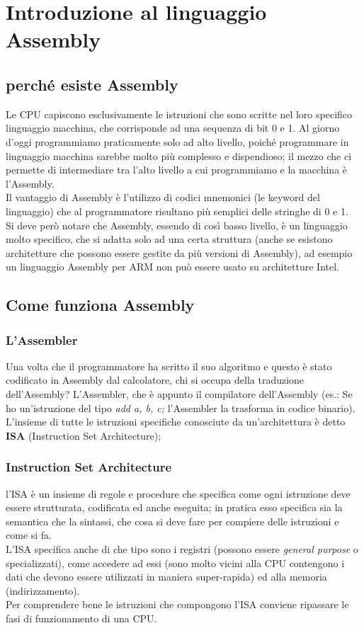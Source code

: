\documentclass[class=book, crop=false]{standalone}
\begin{document}
\chapter{Introduzione al linguaggio Assembly}

\section{perché esiste Assembly}

Le CPU capiscono esclusivamente le istruzioni che sono scritte nel loro specifico linguaggio macchina, che corrisponde ad una sequenza di bit 0 e 1.
Al giorno d’oggi programmiamo praticamente solo ad alto livello,  poiché programmare in linguaggio macchina sarebbe molto più complesso e dispendioso; il mezzo che ci permette di intermediare  tra l'alto livello a cui programmiamo e la macchina è l’Assembly.\\
Il vantaggio di Assembly è l’utilizzo di codici mnemonici  (le keyword del linguaggio) che al programmatore risultano più semplici delle stringhe di 0 e 1.\\
Si deve però notare che Assembly, essendo di così basso livello, è un linguaggio molto specifico, che si adatta solo ad una certa struttura (anche se esistono architetture che possono essere gestite da più versioni di Assembly), ad esempio un linguaggio Assembly per ARM non può essere usato su architetture Intel.

\section{Come funziona Assembly}

\subsection{L'Assembler}
Una volta che il programmatore ha scritto il suo algoritmo e questo è stato codificato in Assembly dal calcolatore, chi si occupa della traduzione dell’Assembly? L’Assembler, che è appunto il compilatore dell’Assembly (es.: Se ho un’istruzione del tipo \emph{add a, b, c;} l’Assembler la trasforma in codice binario).\\
L’insieme di tutte le istruzioni specifiche conosciute da un’architettura è detto \textbf{ISA} (Instruction Set Architecture);

\subsection{Instruction Set Architecture}
l’ISA è un insieme di regole e procedure che specifica come ogni istruzione deve essere strutturata, codificata ed anche eseguita; in pratica esso specifica sia la semantica che la sintassi, che cosa si deve fare per compiere delle istruzioni e come si fa.\\
L’ISA specifica anche di che tipo sono i registri (possono essere \emph{general purpose} o  specializzati), come accedere ad essi (sono molto vicini alla CPU contengono i dati che devono essere utilizzati in maniera super-rapida) ed alla memoria (indirizzamento).\\
Per comprendere bene le istruzioni che compongono l'ISA conviene ripassare le fasi di funzionamento di una CPU.
\end{document}

